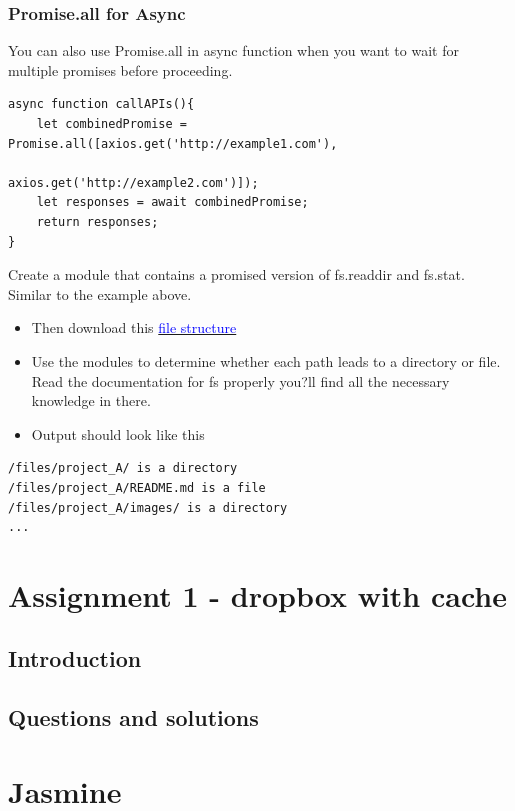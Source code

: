 \documentclass[a4paper]{article}
\begin{document}
\subsubsection{Promise.all for Async}
You can also use Promise.all in async function when you want to wait for multiple promises before proceeding.
\begin{lstlisting}
async function callAPIs(){
    let combinedPromise = Promise.all([axios.get('http://example1.com'),
                                        axios.get('http://example2.com')]);
    let responses = await combinedPromise;
    return responses;
}
\end{lstlisting}
\begin{eg}
Create a module that contains a promised version of fs.readdir and fs.stat. Similar to the example above.\\
\begin{itemize}
\item Then download this \href{https://drive.google.com/file/d/0BwsQDCAXyIETQnR6akExb1AtX3c/view}{\textcolor{blue}{file structure}}
\item Use the modules to determine whether each path leads to a directory or file. Read the documentation for fs properly you?ll find all the necessary knowledge in there.
\item Output should look like this
\end{itemize}
\begin{lstlisting}
/files/project_A/ is a directory
/files/project_A/README.md is a file
/files/project_A/images/ is a directory
...
\end{lstlisting}
\end{eg}


\section{Assignment 1 - dropbox with cache}
\subsection{Introduction}
\subsection{Questions and solutions}



\section{Jasmine}
\end{document}
